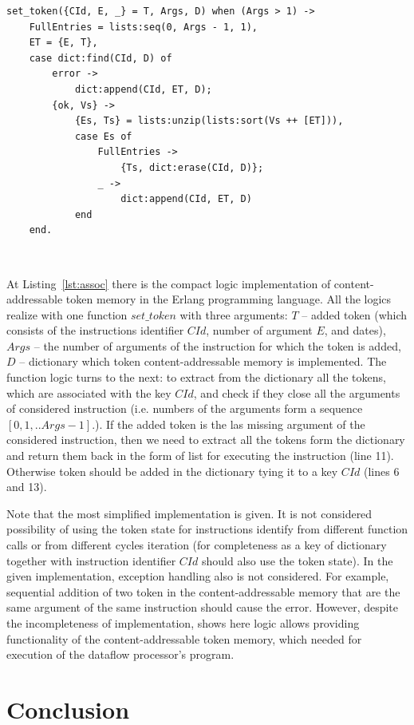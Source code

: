 \documentclass[
11pt,%
tightenlines,%
twoside,%
onecolumn,%
nofloats,%
nobibnotes,%
nofootinbib,%
superscriptaddress,%
noshowpacs,%
centertags]%
{revtex4}
\begin{document}
\begin{lstlisting}[caption={Implementation of the logic of the contest-addressable token memory.},label={lst:assoc}]
set_token({CId, E, _} = T, Args, D) when (Args > 1) ->
	FullEntries = lists:seq(0, Args - 1, 1),
	ET = {E, T},
	case dict:find(CId, D) of
		error ->
			dict:append(CId, ET, D);
		{ok, Vs} ->
			{Es, Ts} = lists:unzip(lists:sort(Vs ++ [ET])),
			case Es of
				FullEntries ->
					{Ts, dict:erase(CId, D)};
				_ ->
					dict:append(CId, ET, D)
			end
	end.
\end{lstlisting}

\

At Listing~\ref{lst:assoc} there is the compact logic implementation of content-addressable token memory in the Erlang programming language. All the logics realize with one function $set\_token$ with three arguments: $T$ -- added token (which consists of the instructions identifier $CId$, number of argument $E$, and dates), $Args$ -- the number of arguments of the instruction for which the token is added, $D$ -- dictionary which token content-addressable memory is implemented. The function logic turns to the next: to extract from the dictionary all the tokens, which are associated with the key $CId$, and check if they close all the arguments of considered instruction (i.e. numbers of the arguments form a sequence $[0, 1, .. Args - 1]$.). If the added token is the las missing argument of the considered instruction, then we need to extract all the tokens form the dictionary and return them back in the form of list for executing the instruction (line 11). Otherwise token should be added in the dictionary tying it to a key $CId$ (lines 6 and 13).

Note that the most simplified implementation is given. It is not considered possibility of using the token state for instructions identify from different function calls or from different cycles iteration (for completeness as a key of dictionary together with instruction identifier $CId$ should also use the token state). In the given implementation, exception handling also is not considered. For example, sequential addition of two token in the content-addressable memory that are the same argument of the same instruction should cause the error. However, despite the incompleteness of implementation, shows here logic allows providing functionality of the content-addressable token memory, which needed for execution of the dataflow processor’s program.

\section{Conclusion}
\end{document}
